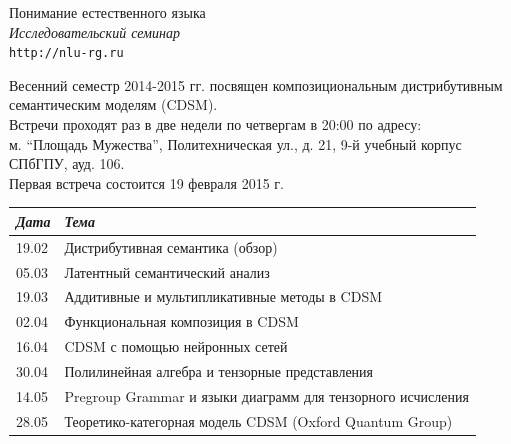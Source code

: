 \documentclass[12pt]{article}
\begin{document}
\baselineskip 24pt

\parindent 0cm


\begin{center}
{\rm \Huge{Понимание естественного языка}}\\
\medskip
{\rm \Large \textit{Исследовательский семинар}}\\
\medskip
{\rm \Large \texttt{http://nlu-rg.ru}}
\end{center}

\bigskip
\bigskip

\baselineskip 15pt

Весенний семестр 2014-2015 гг. посвящен композициональным дистрибутивным семантическим моделям (CDSM).\\

Встречи проходят раз в две недели по четвергам в 20:00 по адресу:\\ м. ``Площадь Мужества'', Политехническая ул., д. 21, 9-й учебный корпус СПбГПУ, ауд. 106.\\

Первая встреча состоится 19 февраля 2015 г.\\

\bigskip
\bigskip
\bigskip

\begin{table}[h]
\centering
\begin{tabular}{@{}ll@{}}
\toprule
\textit{Дата}  & \textit{Тема}                                                        \\ \midrule
19.02 & Дистрибутивная семантика (обзор)                            \\
05.03 & Латентный семантический анализ                               \\
19.03 & Аддитивные и мультипликативные методы в CDSM                \\
02.04 & Функциональная композиция в CDSM                            \\
16.04 & CDSM с помощью нейронных сетей                              \\
30.04 & Полилинейная алгебра и тензорные представления              \\
14.05 & Pregroup Grammar и языки диаграмм для тензорного исчисления \\
28.05 & Теоретико-категорная модель CDSM (Oxford Quantum Group)     \\ \bottomrule 
\end{tabular}
\end{table}
\end{document}
